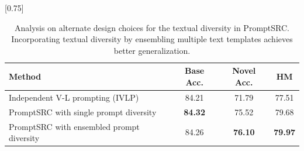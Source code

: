 \begin{table}[!t]
    \small \centering
 \setlength{\tabcolsep}{6pt}
    \scalebox{0.75}[0.75]{
    \begin{tabular}{l cc | c }
    \toprule
    Method  & Base Acc. & Novel Acc. & HM\\
    \midrule
    Independent V-L prompting (IVLP) & 84.21 & 71.79 & 77.51 \\
    PromptSRC with single prompt diversity & \textbf{84.32}	&75.52&	79.68 \\
    \rowcolor{tabhighlight}
    PromptSRC with ensembled prompt diversity & {84.26} & \textbf{76.10} & \textbf{79.97} \\
    \bottomrule
    \end{tabular}
    }\vspace{-0.5em}
    \caption{Analysis on alternate design choices for the textual diversity in PromptSRC. Incorporating textual diversity by ensembling multiple text templates achieves better generalization.
    }
    \label{tab_appendix:alternate_textual_diversity}
\end{table}